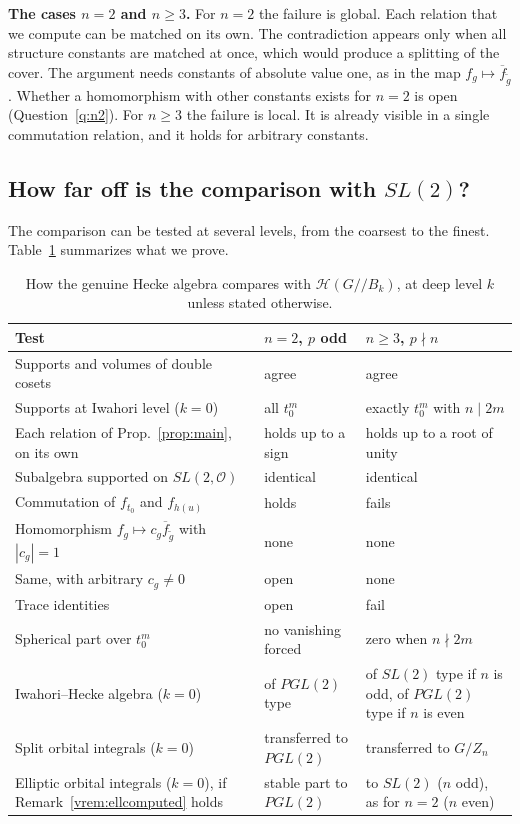 \documentclass[12pt,letterpaper]{amsart}
\numberwithin{equation}{section}
\theoremstyle{definition}
\theoremstyle{remark}
\newcommand{\cO}{\mathcal{O}}
\newcommand{\cH}{\mathcal{H}}
\newcommand{\fbar}{\overline{f}}
\newcommand{\Hlin}{\cH(G/\!/B_k)}
\begin{document}
\noindent
\textbf{The cases $n=2$ and $n\geq 3$.} For $n=2$ the failure is
global. Each relation that we compute can be matched on its own. The
contradiction appears only when all structure constants are matched at
once, which would produce a splitting of the cover.
The argument needs constants of absolute value one, as in the map
$f_g\mapsto\fbar_{\tilde g}$. Whether a homomorphism with other
constants exists for $n=2$ is open (Question~\ref{q:n2}). For
$n\geq 3$ the failure is local. It is already visible in a single
commutation relation, and it holds for arbitrary constants.

\subsection{How far off is the comparison with \texorpdfstring{$SL(2)$}{SL(2)}?}
The comparison can be tested at several levels, from the coarsest to
the finest. Table~\ref{tab:howfar} summarizes what we prove.

\begin{table}[ht]
\caption{How the genuine Hecke algebra compares with $\Hlin$, at deep
level $k$ unless stated otherwise.}
\label{tab:howfar}
\begin{tabular}{@{}p{}p{}p{}@{}}
\toprule
Test & $n=2$, $p$ odd & $n\geq 3$, $p\nmid n$ \\
\midrule
Supports and volumes of double cosets & agree & agree \\
Supports at Iwahori level ($k=0$) & all $t_0^m$ & exactly $t_0^m$ with $n\mid 2m$ \\
Each relation of Prop.~\ref{prop:main}, on its own & holds up to a sign &
holds up to a root of unity \\
Subalgebra supported on $SL(2,\cO)$ & identical & identical \\
Commutation of $f_{t_0}$ and $f_{h(u)}$ & holds & fails \\
Homomorphism $f_g\mapsto c_g\fbar_{\tilde g}$ with $|c_g|=1$ & none &
none \\
Same, with arbitrary $c_g\neq 0$ & open & none \\
Trace identities & open & fail \\
Spherical part over $t_0^m$ & no vanishing forced & zero when $n\nmid 2m$ \\
Iwahori--Hecke algebra ($k=0$) & of $PGL(2)$ type & of $SL(2)$ type if
$n$ is odd, of $PGL(2)$ type if $n$ is even \\
Split orbital integrals ($k=0$) & transferred to $PGL(2)$ & transferred
to $G/Z_n$ \\
Elliptic orbital integrals ($k=0$), if Remark~\ref{vrem:ellcomputed}
holds & stable part to $PGL(2)$ & to $SL(2)$ ($n$ odd), as for $n=2$
($n$ even) \\
\bottomrule
\end{tabular}
\end{table}
\end{document}
